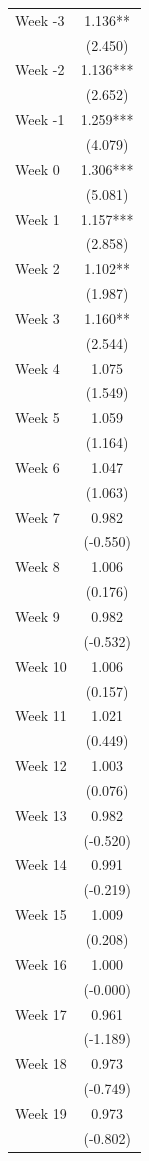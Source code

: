 \begin{tabular}{lc}
Week -3 & 1.136** \\
 & (2.450) \\
Week -2 & 1.136*** \\
 & (2.652) \\
Week -1 & 1.259*** \\
 & (4.079) \\
Week 0 & 1.306*** \\
 & (5.081) \\
Week 1 & 1.157*** \\
 & (2.858) \\
Week 2 & 1.102** \\
 & (1.987) \\
Week 3 & 1.160** \\
 & (2.544) \\
Week 4 & 1.075 \\
 & (1.549) \\
Week 5 & 1.059 \\
 & (1.164) \\
Week 6 & 1.047 \\
 & (1.063) \\
Week 7 & 0.982 \\
 & (-0.550) \\
Week 8 & 1.006 \\
 & (0.176) \\
Week 9 & 0.982 \\
 & (-0.532) \\
Week 10 & 1.006 \\
 & (0.157) \\
Week 11 & 1.021 \\
 & (0.449) \\
Week 12 & 1.003 \\
 & (0.076) \\
Week 13 & 0.982 \\
 & (-0.520) \\
Week 14 & 0.991 \\
 & (-0.219) \\
Week 15 & 1.009 \\
 & (0.208) \\
Week 16 & 1.000 \\
 & (-0.000) \\
Week 17 & 0.961 \\
 & (-1.189) \\
Week 18 & 0.973 \\
 & (-0.749) \\
Week 19 & 0.973 \\
 & (-0.802) \\

\end{tabular}

